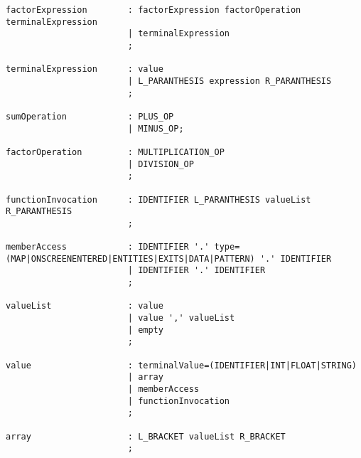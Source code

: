 \begin{lstlisting}[language=CSharp, caption={The grammar for \dazel}, label={lst:DazelGrammar},escapechar=~]
factorExpression        : factorExpression factorOperation terminalExpression
                        | terminalExpression
                        ;

terminalExpression      : value
	                    | L_PARANTHESIS expression R_PARANTHESIS
                        ;

sumOperation            : PLUS_OP 
                        | MINUS_OP;

factorOperation         : MULTIPLICATION_OP 
                        | DIVISION_OP
                        ;

functionInvocation      : IDENTIFIER L_PARANTHESIS valueList R_PARANTHESIS
                        ;

memberAccess            : IDENTIFIER '.' type=(MAP|ONSCREENENTERED|ENTITIES|EXITS|DATA|PATTERN) '.' IDENTIFIER
                        | IDENTIFIER '.' IDENTIFIER
                        ;

valueList               : value
                        | value ',' valueList
                        | empty
                        ;

value                   : terminalValue=(IDENTIFIER|INT|FLOAT|STRING)
                        | array
                        | memberAccess
                        | functionInvocation
                        ;

array                   : L_BRACKET valueList R_BRACKET
                        ;
\end{lstlisting}

\lipsum